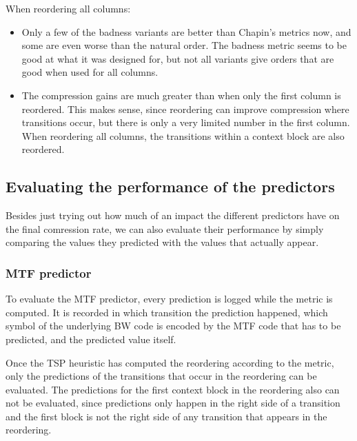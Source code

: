 \documentclass[a4paper]{scrreprt}
\begin{document}
When reordering all columns:
\begin{itemize}
  \item Only a few of the badness variants are better than Chapin's metrics now,
  and some are even worse than the natural order. The badness metric seems to be
  good at what it was designed for, but not all variants give orders that are
  good when used for all columns.
  \item The compression gains are much greater than when only the first column
  is reordered. This makes sense, since reordering can improve compression where
  transitions occur, but there is only a very limited number in the first
  column. When reordering all columns, the transitions within a context block
  are also reordered.
\end{itemize}

\subsection{Evaluating the performance of the predictors}

Besides just trying out how much of an impact the different predictors have on
the final comression rate, we can also evaluate their performance by simply
comparing the values they predicted with the values that actually appear.

\subsubsection{MTF predictor}

To evaluate the MTF predictor, every prediction is logged while the metric is
computed. It is recorded in which transition the prediction happened, which
symbol of the underlying BW code is encoded by the MTF code that has to be
predicted, and the predicted value itself.

Once the TSP heuristic has computed the reordering according to the metric,
only the predictions of the transitions that occur in the reordering can be
evaluated. The predictions for the first context block in the reordering also
can not be evaluated, since predictions only happen in the right side of a
transition and the first block is not the right side of any transition that
appears in the reordering.
\end{document}
